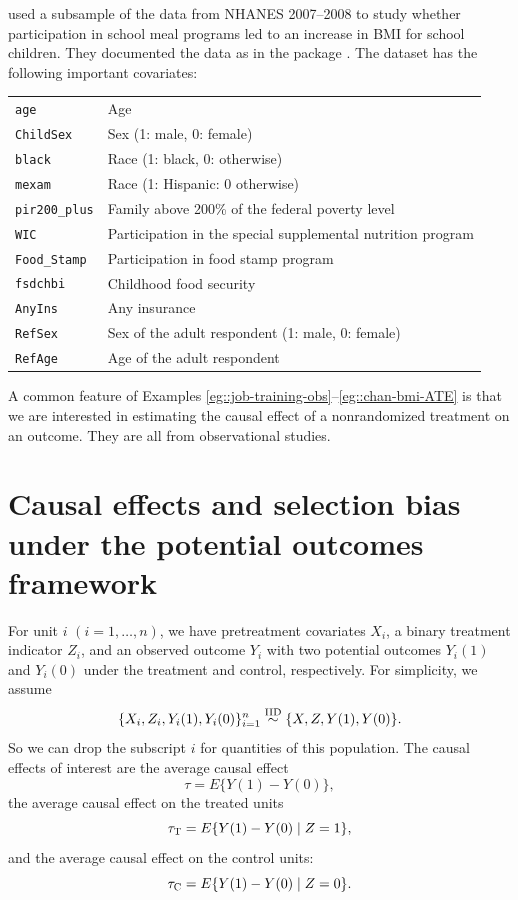  
 
 
   \begin{example} 
 \label{eg::chan-bmi-ATE}
 \citet{chan2016globally} used a subsample of the data from NHANES 2007--2008 to study whether participation in school meal programs led to an increase in BMI for school children. They documented the data as  in the package . The dataset has the following important covariates:
 
\begin{tabular}{ll}
\hline 
\texttt{age}&
Age  
\\
\texttt{ChildSex}&
Sex (1: male, 0: female)
\\
\texttt{black}&
Race (1: black, 0: otherwise) 
\\
\texttt{mexam}&
Race (1: Hispanic: 0 otherwise)
\\
\texttt{pir200\_plus}&
Family above 200\% of the federal poverty level  \\
\texttt{WIC}&
Participation in the special supplemental nutrition program \\
\texttt{Food\_Stamp}&
Participation in food stamp program   \\
\texttt{fsdchbi}&
Childhood food security  \\
\texttt{AnyIns}&
Any insurance \\
\texttt{RefSex}&
Sex of the adult respondent (1: male, 0: female) \\
\texttt{RefAge}&
Age of the adult respondent\\
\hline 
\end{tabular} 

 \end{example}
 
A common feature of Examples \ref{eg::job-training-obs}--\ref{eg::chan-bmi-ATE} is that we are interested in estimating the causal effect of a nonrandomized treatment on an outcome. They are all from observational studies. 
 
 
\section{Causal effects and selection bias under the potential outcomes framework} 
 \label{sec::selection-bias-randomization}

 
 
For unit $i$ $(i=1,\ldots, n)$, we have  pretreatment covariates $X_i$, a binary treatment indicator $Z_i$, and an observed outcome $Y_i$ with two potential outcomes  $Y_i(1)$ and $Y_i(0)$ under the treatment and control, respectively. For simplicity, we assume   
$$
\{X_i, Z_i, Y_i(1),  Y_i(0)  \}_{i=1}^n \stackrel{\textup{IID}}{\sim} \{  X, Z, Y(1),  Y(0) \} .
$$ 
So we can drop the subscript $i$ for quantities of this population.  
The causal effects of interest are the average causal effect
$$
\tau = E\{  Y(1) - Y(0)  \},
$$
the average causal effect on the treated units
$$
\tau_\textsc{T} =  E\{  Y(1) - Y(0)  \mid Z = 1 \},
$$
and the average causal effect on the control units:
$$
\tau_\textsc{C} =  E\{  Y(1) - Y(0)  \mid Z = 0 \}. 
$$ 

